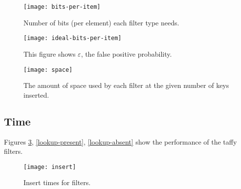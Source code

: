 \documentclass[manuscript,screen,review]{acmart}
\begin{document}
\begin{figure}

  \texttt{[image: bits-per-item]}
  \caption{  \label{bits-per-item}
Number of bits (per element) each filter type needs.}
\end{figure}

\begin{figure}
  \texttt{[image: ideal-bits-per-item]}
  \caption{  \label{ideal-bits-per-item}
This figure shows $\varepsilon$, the false positive probability.}
\end{figure}




\begin{figure}
  \texttt{[image: space]}
  \caption{
    The amount of space used by each filter at the given number of keys inserted.
  }
\end{figure}

\subsection{Time}

Figures \ref{insert-time}, \ref{lookup-present}, \ref{lookup-absent} show the performance of the taffy filters.

\begin{figure}
  \texttt{[image: insert]}
  \caption{
    \label{insert-time}
    Insert times for filters.
  }
\end{figure}
\end{document}
